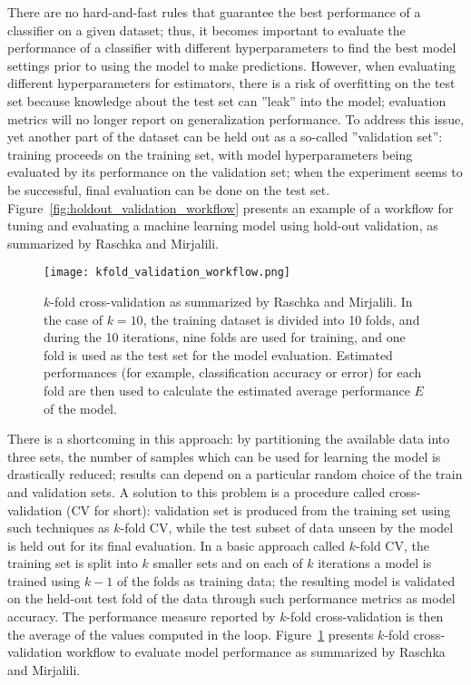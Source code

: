 There are no hard-and-fast rules that guarantee the best performance of a classifier on a given dataset\cite{Raschka2018};
thus, it becomes important to evaluate the performance of a classifier with different hyperparameters to find the best model settings prior to using the model to make predictions.
However, when evaluating different hyperparameters for estimators, there is a risk of overfitting on the test set because knowledge about the test set can ''leak'' into the model;
evaluation metrics will no longer report on generalization performance.
To address this issue, yet another part of the dataset can be held out as a so-called ''validation set'': training proceeds on the training set, with model hyperparameters being evaluated by its performance on the validation set;
when the experiment seems to be successful, final evaluation can be done on the test set.
Figure~\ref{fig:holdout_validation_workflow} presents an example of a workflow for tuning and evaluating a machine learning model using hold-out validation, as summarized by Raschka and Mirjalili\cite{RaschkaMirjalili2017}.

\begin{figure}[hbt!]
    \centering
    \texttt{[image: kfold\_validation\_workflow.png]}
    \caption{$k$-fold cross-validation as summarized by Raschka and Mirjalili\cite{RaschkaMirjalili2017}.
    In the case of $k=10$, the training dataset is divided into 10 folds, and during the 10 iterations, nine folds are used for training, and one fold is used as the test set for the model evaluation.
    Estimated performances (for example, classification accuracy or error) for each fold are then used to calculate the estimated average performance $E$ of the model.}
    \label{fig:kfold_validation_workflow}
\end{figure}

There is a shortcoming in this approach: by partitioning the available data into three sets, the number of samples which can be used for learning the model is drastically reduced;
results can depend on a particular random choice of the train and validation sets.
A solution to this problem is a procedure called cross-validation (CV for short): validation set is produced from the training set using such techniques as $k$-fold CV, while the test subset of data unseen by the model is held out for its final evaluation.
In a basic approach called $k$-fold CV, the training set is split into $k$ smaller sets and on each of $k$ iterations a model is trained using $k-1$ of the folds as training data;
the resulting model is validated on the held-out test fold of the data through such performance metrics as model accuracy.
The performance measure reported by $k$-fold cross-validation is then the average of the values computed in the loop.
Figure~\ref{fig:kfold_validation_workflow} presents $k$-fold cross-validation workflow to evaluate model performance as summarized by Raschka and Mirjalili\cite{RaschkaMirjalili2017}.


